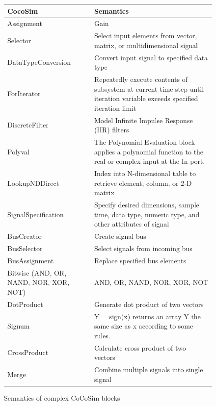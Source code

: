 \documentclass{article}
\begin{document}
\begin{figure}[t]
\centering
{
\begin{tabular}{lp{6cm}}
\hline
\textbf{CocoSim} & \textbf{Semantics}  \\
\hline

Assignment &
Gain
\\

Selector &
Select input elements from vector, matrix, or multidimensional signal
\\

DataTypeConversion &
Convert input signal to specified data type
\\

ForIterator &
Repeatedly execute contents of subsystem at current time step until iteration variable exceeds specified iteration limit
\\

DiscreteFilter &
Model Infinite Impulse Response (IIR) filters
\\

Polyval &
The Polynomial Evaluation block applies a polynomial function to the real or complex input at the In port.
\\

LookupNDDirect &
Index into N-dimensional table to retrieve element, column, or 2-D matrix
\\

SignalSpecification &
Specify desired dimensions, sample time, data type, numeric type, and other attributes of signal
\\

BusCreator &
Create signal bus
\\

BusSelector &
Select signals from incoming bus
\\

BusAssignment &
Replace specified bus elements
\\

Bitwise (AND, OR, NAND, NOR, XOR, NOT) &
AND, OR, NAND, NOR, XOR, NOT
\\

DotProduct &
Generate dot product of two vectors
\\

Signum &
Y = sign(x) returns an array Y the same size as x according to some rules.
\\

CrossProduct &
Calculate cross product of two vectors
\\

Merge &
Combine multiple signals into single signal
\\

\hline
\end{tabular}
}
\caption{Semantics of complex CoCoSim blocks}
\label{mapping4}
\end{figure}
\end{document}
